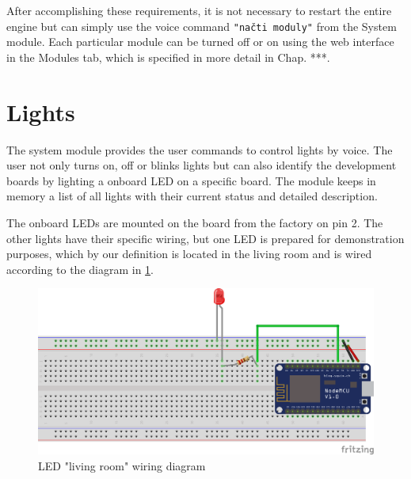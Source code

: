 After accomplishing these requirements, it is not necessary to restart the entire engine but can simply use the voice command \texttt{"načti moduly"} from the System module. Each particular module can be turned off or on using the web interface in the Modules tab, which is specified in more detail in Chap. ***.

\section{Lights}

The system module provides the user commands to control lights by voice. The user not only turns on, off or blinks lights but can also identify the development boards by lighting a onboard LED on a specific board. The module keeps in memory a list of all lights with their current status and detailed description.

The onboard LEDs are mounted on the board from the factory on pin 2. The other lights have their specific wiring, but one LED is prepared for demonstration purposes, which by our definition is located in the living room and is wired according to the diagram in \cref{fig:led_schema}. 

\begin{figure}[H]
	\centering
	\includegraphics[width=\textwidth]{img/led_schema.png}
	\caption{LED "living room" wiring diagram}
	\label{fig:led_schema}
\end{figure}


